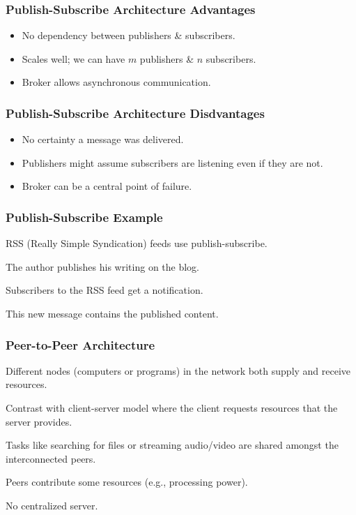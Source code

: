 \begin{frame}
\frametitle{Publish-Subscribe Architecture Advantages}

\begin{changemargin}{1cm}

\begin{itemize}
\item No dependency between publishers \& subscribers.
\item Scales well; we can have $m$ publishers \& $n$ subscribers.
\item Broker allows asynchronous communication.
\end{itemize}
\end{changemargin}
\end{frame}

\begin{frame}
\frametitle{Publish-Subscribe Architecture Disdvantages}

\begin{changemargin}{1cm}

\begin{itemize}
\item No certainty a message was delivered.
\item Publishers might assume subscribers are listening even if they are not.
\item Broker can be a central point of failure.
\end{itemize}
\end{changemargin}
\end{frame}

\begin{frame}
\frametitle{Publish-Subscribe Example}

\begin{changemargin}{1cm}
RSS (Really Simple Syndication) feeds use publish-subscribe.

The author publishes his writing on the blog.

Subscribers to the RSS feed get a notification.
 
This new message contains the published content.


\end{changemargin}
\end{frame}

\begin{frame}
\frametitle{Peer-to-Peer Architecture}

\begin{changemargin}{1cm}
Different nodes (computers or programs) in the network both supply and receive resources.

Contrast with client-server model where the client requests resources that the server provides.

Tasks like searching for files or streaming audio/video are shared amongst the interconnected peers.

Peers contribute some resources (e.g., processing power).

No centralized server.

\end{changemargin}
\end{frame}


